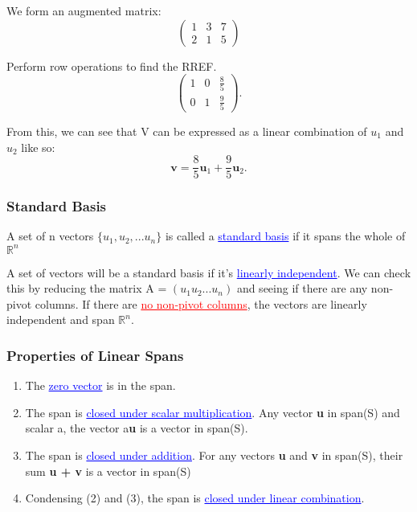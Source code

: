 \documentclass{article}
\newcommand{\bul}[1]{\textcolor{blue}{\underline{#1}}}
\newcommand{\rul}[1]{\textcolor{red}{\underline{#1}}}
\newcommand{\sbreak}{\vspace{10pt}}
\begin{document}
We form an augmented matrix:
\[
\left(
\begin{array}{cc|c}
1 & 3 & 7 \\
2 & 1 & 5
\end{array}
\right)
\]

Perform row operations to find the RREF.
\[
\begin{pmatrix}
1 & 0 & \frac{8}{5} \\
0 & 1 & \frac{9}{5}
\end{pmatrix}.
\]

From this, we can see that V can be expressed as a linear combination of $u_1$ and $u_2$ like so:
\[
\mathbf{v} = \frac{8}{5} \mathbf{u}_1 + \frac{9}{5} \mathbf{u}_2.
\]

\subsubsection{Standard Basis}
A set of n vectors $\{ u_1, u_2, ... u_n \}$ is called a \bul{standard basis} if it spans the whole of $\mathbb{R}^n$

\sbreak

A set of vectors will be a standard basis if it's \bul{linearly independent}. We can check this by reducing the matrix A = $(u_1 u_2 ... u_n)$ and seeing if there are any non-pivot columns. If there are \rul{no non-pivot columns}, the vectors are linearly independent and span $\mathbb{R}^n$.

\subsubsection{Properties of Linear Spans}
\begin{enumerate}
    \item The \bul{zero vector} is in the span.
    \item The span is \bul{closed under scalar multiplication}. Any vector \textbf{u} in span(S) and scalar a, the vector a\textbf{u} is a vector in span(S).
    \item The span is \bul{closed under addition}. For any vectors \textbf{u} and \textbf{v} in span(S), their sum \textbf{u + v} is a vector in span(S)
    \item Condensing (2) and (3), the span is \bul{closed under linear combination}.
\end{enumerate}
\end{document}
